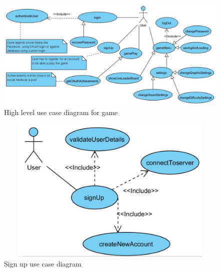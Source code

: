 \documentclass[letterpaper]{article}
\begin{document}
		\vspace{0.2in}
		
		\section*{\colorbox{black}{}} 
				
		\begin{figure}[ht!]
		\centering
		\includegraphics[width=180mm]{UML_Diagram/Use_Case/high_level_use_case_diagram}
		\caption{High level use case diagram for game}
		\label{overflow}
		\end{figure}
		
		\vspace{0.2in}
		
		\begin{figure}[ht!]
		\centering
		\includegraphics[width=180mm, height=70mm]{UML_Diagram/Use_Case/signup}
		\caption{Sign up use case diagram}
		\label{overflow}
		\end{figure}
		
		\vspace{0.2in}
		
\end{document}
